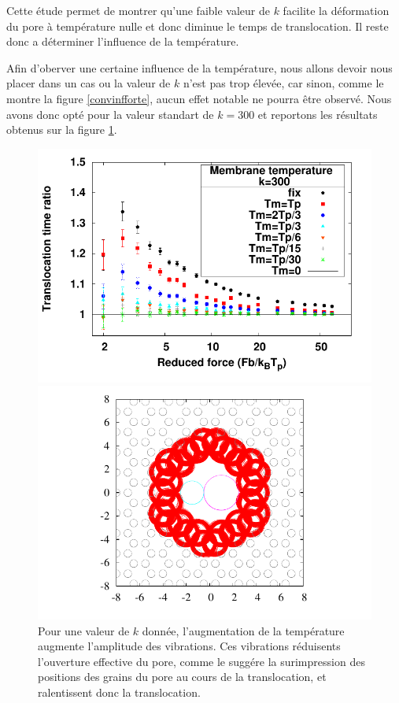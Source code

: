 Cette étude permet de montrer qu'une faible valeur de $k$ facilite la déformation du pore à température nulle et donc diminue le temps de translocation. Il reste donc a déterminer l'influence de la température.

\newpage

Afin d'oberver une certaine influence de la température, nous allons devoir nous placer dans un cas ou la valeur de $k$ n'est pas trop élevée, car sinon, comme le montre la figure \ref{convinfforte}, aucun effet notable ne pourra être observé. Nous avons donc opté pour la valeur standart de $k=300$ et reportons les résultats obtenus sur la figure \ref{influencetemperature}.


\begin{figure}[H]
\includegraphics[width=\textwidth]{compkstandarttonotempdifferenttemp.pdf} 
\begin{minipage}{0.63\linewidth}
\includegraphics[width=\textwidth]{poreareawtempknorm.pdf}
\end{minipage}
\begin{minipage}{0.37\linewidth} 
\caption[Influence de la température]{Pour une valeur de $k$ donnée, l'augmentation de la température augmente l'amplitude des vibrations. Ces vibrations réduisents l'ouverture effective du pore, comme le suggére la surimpression des positions des grains du pore au cours de la translocation, et ralentissent donc la translocation.}
\label{influencetemperature}
\end{minipage}
\end{figure}

